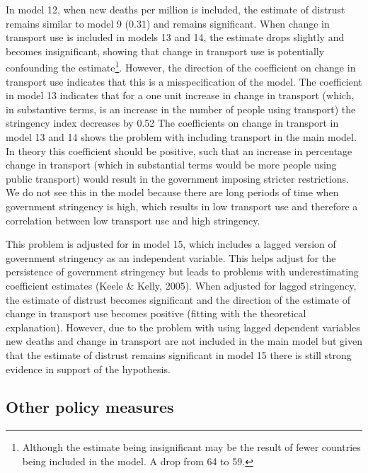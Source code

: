 \documentclass[
  12pt,
]{article}
\begin{document}
In model 12, when new deaths per million is included, the estimate of distrust remains similar to model 9 (0.31) and remains significant. When change in transport use is included in models 13 and 14, the estimate drops slightly and becomes insignificant, showing that change in transport use is potentially confounding the estimate\footnote{Although the estimate being insignificant may be the result of fewer countries being included in the model. A drop from 64 to 59.}. However, the direction of the coefficient on change in transport use indicates that this is a misspecification of the model. The coefficient in model 13 indicates that for a one unit increase in change in transport (which, in substantive terms, is an increase in the number of people using transport) the stringency index decreases by 0.52 The coefficients on change in transport in model 13 and 14 shows the problem with including transport in the main model. In theory this coefficient should be positive, such that an increase in percentage change in transport (which in substantial terms would be more people using public transport) would result in the government imposing stricter restrictions. We do not see this in the model because there are long periods of time when government stringency is high, which results in low transport use and therefore a correlation between low transport use and high stringency.

This problem is adjusted for in model 15, which includes a lagged version of government stringency as an independent variable. This helps adjust for the persistence of government stringency but leads to problems with underestimating coefficient estimates (Keele \& Kelly, 2005). When adjusted for lagged stringency, the estimate of distrust becomes significant and the direction of the estimate of change in transport use becomes positive (fitting with the theoretical explanation). However, due to the problem with using lagged dependent variables new deaths and change in transport are not included in the main model but given that the estimate of distrust remains significant in model 15 there is still strong evidence in support of the hypothesis.\\

\hypertarget{other-policy-measures}{%
\subsection{Other policy measures}\label{other-policy-measures}}
\end{document}
